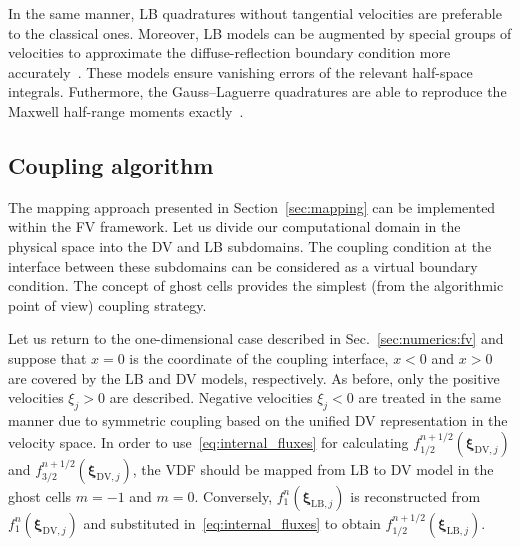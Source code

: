 \documentclass{elsarticle} %
\newcommand{\bxi}{\boldsymbol{\xi}}
\newcommand{\LB}{\mathrm{LB}}
\newcommand{\DV}{\mathrm{DV}}
\begin{document}
In the same manner, LB quadratures without tangential velocities are preferable to the classical ones.
Moreover, LB models can be augmented by special groups of velocities to approximate
the diffuse-reflection boundary condition more accurately~\cite{Feuchter2016}.
These models ensure vanishing errors of the relevant half-space integrals.
Futhermore, the Gauss--Laguerre quadratures are able to reproduce the Maxwell half-range moments
exactly~\cite{Ambrus2014, Ambrus2016}.

\subsection{Coupling algorithm}\label{sec:numerics:coupling}

The mapping approach presented in Section~\ref{sec:mapping} can be implemented within the FV framework.
Let us divide our computational domain in the physical space into the DV and LB subdomains.
The coupling condition at the interface between these subdomains can be considered as a virtual boundary condition.
The concept of ghost cells provides the simplest (from the algorithmic point of view) coupling strategy.

Let us return to the one-dimensional case described in Sec.~\ref{sec:numerics:fv}
and suppose that \(x=0\) is the coordinate of the coupling interface,
\(x<0\) and \(x>0\) are covered by the LB and DV models, respectively.
As before, only the positive velocities \(\xi_j>0\) are described.
Negative velocities \(\xi_j<0\) are treated in the same manner due to
symmetric coupling based on the unified DV representation in the velocity space.
In order to use~\eqref{eq:internal_fluxes} for calculating \(f^{n+1/2}_{1/2}(\bxi_{\DV,j})\)
and \(f^{n+1/2}_{3/2}(\bxi_{\DV,j})\),
the VDF should be mapped from LB to DV model in the ghost cells \(m=-1\) and \(m=0\).
Conversely, \(f^n_1(\bxi_{\LB,j})\) is reconstructed from \(f^n_1(\bxi_{\DV,j})\)
and substituted in~\eqref{eq:internal_fluxes} to obtain \(f^{n+1/2}_{1/2}(\bxi_{\LB,j})\).
\end{document}
